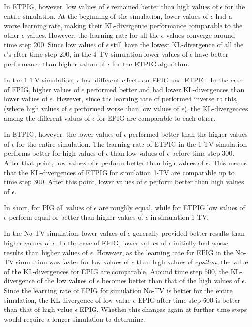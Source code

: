 \documentclass[12pt]{thesis}
\begin{document}
In ETPIG, however, low values of $\epsilon$ remained better than high values of $\epsilon$ for the entire simulation. At the beginning of the simulation, lower values of $\epsilon$ had a worse learning rate, making their KL-divergence performance comparable to the other $\epsilon$ values. However, the learning rate for all the $\epsilon$ values converge around time step 200. Since low values of $\epsilon$ still have the lowest KL-divergence of all the $\epsilon$'s after time step 200, in the 4-TV simulation lower values of $\epsilon$ have better performance than higher values of $\epsilon$ for the ETPIG algorithm.

In the 1-TV simulation, $\epsilon$ had different effects on EPIG and ETPIG. In the case of EPIG, higher values of $\epsilon$ performed better and had lower KL-divergences than lower values of $\epsilon$. However, since the learning rate of performed inverse to this, (where high values of $\epsilon$ performed worse than low values of $\epsilon$), the KL-divergences among the different values of $\epsilon$ for EPIG are comparable to each other.

In ETPIG, however, the lower values of $\epsilon$ performed better than the higher values of $\epsilon$ for the entire simulation. The learning rate of ETPIG in the 1-TV simulation performs better for high values of $\epsilon$ than low values of $\epsilon$ before time step 300. After that point, low values of $\epsilon$ perform better than high values of $\epsilon$. This means that the KL-divergences of ETPIG for simulation 1-TV are comparable up to time step 300. After this point, lower values of $\epsilon$ perform better than high values of $\epsilon$.

In short, for PIG all values of $\epsilon$ are roughly equal, while for ETPIG low values of $\epsilon$ perform equal or better than higher values of $\epsilon$ in simulation 1-TV.

In the No-TV simulation, lower values of $\epsilon$ generally provided better results than higher values of $\epsilon$. In the case of EPIG, lower values of $\epsilon$ initially had worse results than higher values of $\epsilon$. However, as the learning rate for EPIG in the No-TV simulation was faster for low values of $\epsilon$ than high values of $epsilon$, the value of the KL-divergences for EPIG are comparable. Around time step 600, the KL-divergence of the low values of $\epsilon$ becomes better than that of the high values of $\epsilon$. Since the learning rate of EPIG for simulation No-TV is better for the entire simulation, the KL-divergence of low value $\epsilon$ EPIG after time step 600 is better than that of high value $\epsilon$ EPIG. Whether this changes again at further time steps would require a longer simulation to determine.
\end{document}

